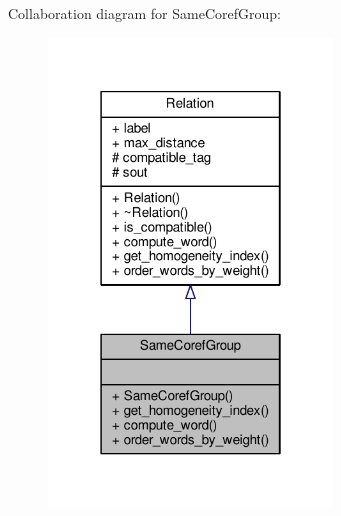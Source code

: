 Collaboration diagram for Same\+Coref\+Group\+:
\nopagebreak
\begin{figure}[H]
\begin{center}
\leavevmode
\includegraphics[width=214pt]{classSameCorefGroup__coll__graph}
\end{center}
\end{figure}
